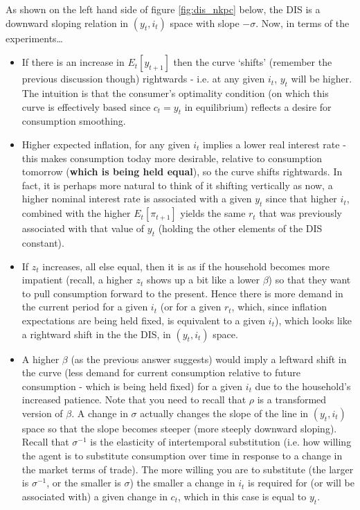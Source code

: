 \documentclass[authoryear,11pt]{elsarticle}
\begin{document}
As shown on the left hand side of figure \ref{fig:dis_nkpc} below, the DIS is a downward sloping relation in $(y_{t},i_{t})$ space with slope $-\sigma$. Now, in terms of the experiments\ldots
\begin{itemize}
\item	If there is an increase in $E_{t}[y_{t+1}]$ then the curve `shifts' (remember the previous discussion though) rightwards - i.e. at any given $i_{t}$, $y_{t}$ will be higher. The intuition is that the consumer's optimality condition (on which this curve is effectively based since $c_{t}=y_{t}$ in equilibrium) reflects a desire for consumption smoothing.
\item	Higher expected inflation, for any given $i_{t}$ implies a lower real interest rate - this makes consumption today more desirable, relative to consumption tomorrow (\textbf{which is being held equal}), so the curve shifts rightwards. In fact, it is perhaps more natural to think of it shifting vertically as now, a higher nominal interest rate is associated with a given $y_{t}$ since that higher $i_{t}$, combined with the higher $E_{t}[\pi_{t+1}]$ yields the same $r_{t}$ that was previously associated with that value of $y_{t}$ (holding the other elements of the DIS constant).
\item	If $z_{t}$ increases, all else equal, then it is as if the household becomes more impatient (recall, a higher $z_{t}$ shows up a bit like a lower $\beta$) so that they want to pull consumption forward to the present. Hence there is more demand in the current period for a given $i_{t}$ (or for a given $r_{t}$, which, since inflation expectations are being held fixed, is equivalent to a given $i_{t}$), which looks like a rightward shift in the the DIS, in $(y_{t},i_{t})$ space.
\item	A higher $\beta$ (as the previous answer suggests) would imply a leftward shift in the curve (less demand for current consumption relative to future consumption - which is being held fixed) for a given $i_{t}$ due to the household's increased patience. Note that you need to recall that $\rho$ is a transformed version of $\beta$. A change in $\sigma$ actually changes the slope of the line in $(y_{t},i_{t})$ space so that the slope becomes steeper (more steeply downward sloping). Recall that $\sigma^{-1}$ is the elasticity of intertemporal substitution (i.e. how willing the agent is to substitute consumption over time in response to a change in the market terms of trade). The more willing you are to substitute (the larger is $\sigma^{-1}$, or the smaller is $\sigma$) the smaller a change in $i_{t}$ is required for (or will be associated with) a given change in $c_{t}$, which in this case is equal to $y_{t}$.
\end{itemize}
\end{document}
